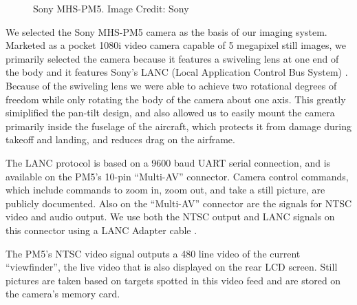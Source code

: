 \documentclass[pdftex,10pt,letter]{article}
\begin{document}
\begin{figure} [h!]
	\centering
	\caption{Sony MHS-PM5. Image Credit: Sony}
	\label{fig:camera}
\end{figure}

We selected the Sony MHS-PM5 camera as the basis of our imaging system. Marketed as a pocket 1080i video camera capable of 5 megapixel still images, we primarily selected the camera because it features a swiveling lens at one end of the body and it features Sony's LANC (Local Application Control Bus System) \cite{lanc}. Because of the swiveling lens we were able to achieve two rotational degrees of freedom while only rotating the body of the camera about one axis.  This greatly simiplified the pan-tilt design, and also allowed us to easily mount the camera primarily inside the fuselage of the aircraft, which protects it from damage during takeoff and landing, and reduces drag on the airframe. 

The LANC protocol is based on a 9600 baud UART serial connection, and is available on the PM5's 10-pin ``Multi-AV'' connector. Camera control commands, which include commands to zoom in, zoom out, and take a still picture, are publicly documented.  Also on the ``Multi-AV'' connector are the signals for NTSC video and audio output. We use both the NTSC output and LANC signals on this connector using a LANC Adapter cable \cite{lanc_adapter}.

The PM5's NTSC video signal outputs a 480 line video of the current ``viewfinder'', the live video that is also displayed on the rear LCD screen.  Still pictures are taken based on targets spotted in this video feed and are stored on the camera's memory card.
\end{document}
